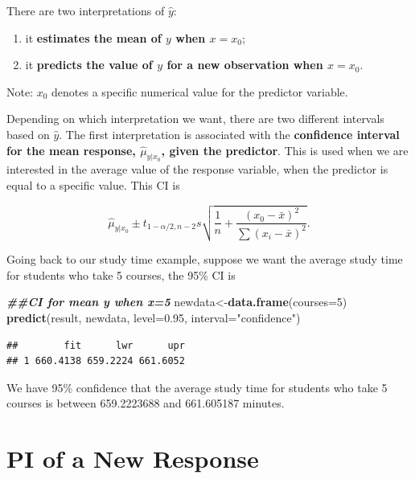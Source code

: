 \documentclass[
]{book}
\newenvironment{Shaded}{\begin{snugshade}}{\end{snugshade}}
\newcommand{\AttributeTok}[1]{\textcolor[rgb]{0.13,0.29,0.53}{#1}}
\newcommand{\DecValTok}[1]{\textcolor[rgb]{0.00,0.00,0.81}{#1}}
\newcommand{\DocumentationTok}[1]{\textcolor[rgb]{0.56,0.35,0.01}{\textbf{\textit{#1}}}}
\newcommand{\FloatTok}[1]{\textcolor[rgb]{0.00,0.00,0.81}{#1}}
\newcommand{\FunctionTok}[1]{\textcolor[rgb]{0.13,0.29,0.53}{\textbf{#1}}}
\newcommand{\NormalTok}[1]{#1}
\newcommand{\OtherTok}[1]{\textcolor[rgb]{0.56,0.35,0.01}{#1}}
\newcommand{\StringTok}[1]{\textcolor[rgb]{0.31,0.60,0.02}{#1}}
\providecommand{\tightlist}{%
  \setlength{\itemsep}{0pt}\setlength{\parskip}{0pt}}
\begin{document}
There are two interpretations of \(\hat{y}\):

\begin{enumerate}
\def\labelenumi{\arabic{enumi}.}
\tightlist
\item
  it \textbf{estimates the mean of \(y\) when \(x=x_0\)};
\item
  it \textbf{predicts the value of \(y\) for a new observation when \(x=x_0\)}.
\end{enumerate}

Note: \(x_0\) denotes a specific numerical value for the predictor variable.

Depending on which interpretation we want, there are two different intervals based on \(\hat{y}\). The first interpretation is associated with the \textbf{confidence interval for the mean response, \(\hat{\mu}_{y|x_0}\), given the predictor}. This is used when we are interested in the average value of the response variable, when the predictor is equal to a specific value. This CI is

\begin{equation} 
\hat{\mu}_{y|x_0}\pm t_{1-\alpha/2,n-2}s\sqrt{\frac{1}{n} +
\frac{(x_0-\bar{x})^2}{\sum(x_i-\bar{x})^2}}.
\label{eq:4CImean}
\end{equation}

Going back to our study time example, suppose we want the average study time for students who take 5 courses, the 95\% CI is

\begin{Shaded}
\begin{Highlighting}[]
\DocumentationTok{\#\#CI for mean y when x=5}
\NormalTok{newdata}\OtherTok{\textless{}{-}}\FunctionTok{data.frame}\NormalTok{(}\AttributeTok{courses=}\DecValTok{5}\NormalTok{)}
\FunctionTok{predict}\NormalTok{(result, newdata, }\AttributeTok{level=}\FloatTok{0.95}\NormalTok{, }\AttributeTok{interval=}\StringTok{"confidence"}\NormalTok{)}
\end{Highlighting}
\end{Shaded}

\begin{verbatim}
##        fit      lwr      upr
## 1 660.4138 659.2224 661.6052
\end{verbatim}

We have 95\% confidence that the average study time for students who take 5 courses is between 659.2223688 and 661.605187 minutes.

\hypertarget{pi-of-a-new-response}{%
\section{PI of a New Response}\label{pi-of-a-new-response}}
\end{document}
